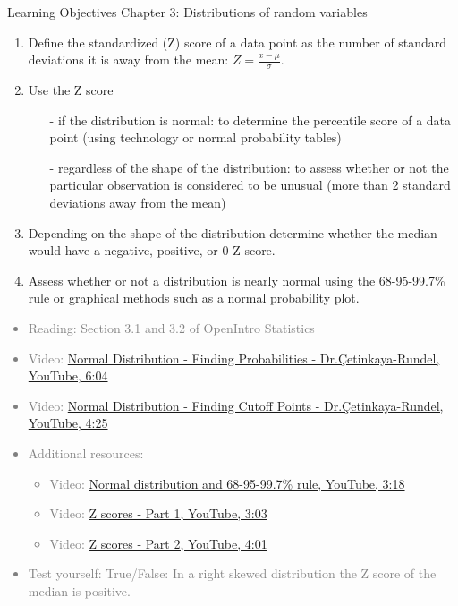 \documentclass[11pt]{article}
\newcommand{\gray}[1]{\textcolor{gray}{#1}}
\begin{document}
{\LARGE \textcolor{oiB}{Learning Objectives \hfill Chapter 3: Distributions of random variables}} \\

\begin{enumerate}
\renewcommand\labelenumi{\textcolor{oiB}{\textbf{LO \theenumi.}}}

\item Define the standardized (Z) score of a data point as the number of standard deviations it is away from the mean: $Z = \frac{x - \mu}{\sigma}$.

\item Use the Z score 
\begin{itemize}
\item[-] if the distribution is normal: to determine the percentile score of a data point (using technology or normal probability tables)
\item[-] regardless of the shape of the distribution: to assess whether or not the particular observation is considered to be unusual (more than 2 standard deviations away from the mean) 
\end{itemize}

\item Depending on the shape of the distribution determine whether the median would have a negative, positive, or 0 Z score.

\item Assess whether or not a distribution is nearly normal using the 68-95-99.7\% rule or graphical methods such as a normal probability plot.

\end{enumerate}

\gray{
{\it
\vspace{-0.75cm}
\begin{itemize}
\renewcommand{\labelitemi}{{\textcolor{oiB}{$\ast$}}}
\item Reading: Section 3.1 and 3.2 of OpenIntro Statistics
\item Video: \href{http://www.youtube.com/watch?v=ev463hHe544}{Normal Distribution - Finding Probabilities - Dr.\c{C}etinkaya-Rundel, YouTube, 6:04}
\item Video: \href{http://www.youtube.com/watch?v=6rAg4Y6NirU}{Normal Distribution - Finding Cutoff Points - Dr.\c{C}etinkaya-Rundel, YouTube, 4:25}
\item Additional resources:
\begin{itemize}
\item Video: \href{http://www.youtube.com/watch?v=McSFVzc8Swk&list=PL568547ACA9211CCA&index=24}{Normal distribution and 68-95-99.7\% rule, YouTube, 3:18}
\item Video: \href{http://www.youtube.com/watch?v=5v3Czc6ZK-Q&list=PL568547ACA9211CCA&index=23}{Z scores - Part 1, YouTube, 3:03} 
\item Video: \href{http://www.youtube.com/watch?v=aa_deKPDgI4&list=PL568547ACA9211CCA&index=22}{Z scores - Part 2, YouTube, 4:01}
\end{itemize}
\item Test yourself: True/False: In a right skewed distribution the Z score of the median is positive.
\end{itemize}
}}
\end{document}
